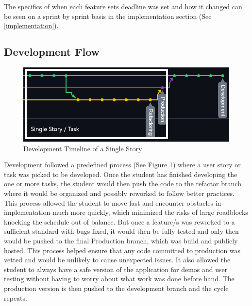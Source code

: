 The specifics of when each feature sets deadline was set and how it changed can be seen on a sprint by sprint basis in the implementation section (See \ref{implementation}).

\subsection{Development Flow} \label{devflow}
\begin{figure}
    \centering
    \includegraphics[width=1\columnwidth]{author-files/figures/SingleStoryPath2.png}
    \caption{Development Timeline of a Single Story}
    \label{fig:singlestory}
\end{figure}

Development followed a predefined process (See Figure \ref{fig:singlestory}) where a user story or task was picked to be developed. Once the student has finished developing the one or more tasks, the student would then push the code to the refactor branch where it would be organized and possibly reworked to follow better practices. This process allowed the student to move fast and encounter obstacles in implementation much more quickly, which minimized the risks of large roadblocks knocking the schedule out of balance. But once a feature/s was reworked to a sufficient standard with bugs fixed, it would then be fully tested and only then would be pushed to the final Production branch, which was build and publicly hosted.
This process helped ensure that any code committed to production was vetted and would be unlikely to cause unexpected issues. It also allowed the student to always have a safe version of the application for demos and user testing without having to worry about what work was done before hand.
The production version is then pushed to the development branch and the cycle repeats.


